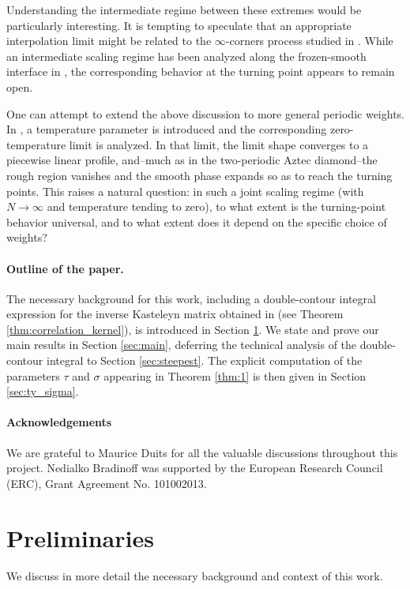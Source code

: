 \documentclass[11pt]{article}
\theoremstyle{plain}
\theoremstyle{definition}
\numberwithin{equation}{section}
\begin{document}
Understanding the intermediate regime between these extremes would be particularly interesting. It is tempting to speculate that an appropriate interpolation limit might be related to the $\infty$-corners process studied in \cite{GK24,GM20}. While an intermediate scaling regime has been analyzed along the frozen-smooth interface in \cite{JM23}, the corresponding behavior at the turning point appears to remain open.

One can attempt to extend the above discussion to more general periodic weights. In \cite{BB24}, a temperature parameter is introduced and the corresponding zero-temperature limit is analyzed. In that limit, the limit shape converges to a piecewise linear profile, and--much as in the two-periodic Aztec diamond--the rough region vanishes and the smooth phase expands so as to reach the turning points. This raises a natural question: in such a joint scaling regime (with $N\to\infty$ and temperature tending to zero), to what extent is the turning-point behavior universal, and to what extent does it depend on the specific choice of weights?



%

\paragraph{Outline of the paper.}
The necessary background for this work, including a double-contour integral expression for the inverse Kasteleyn matrix obtained in \cite{Ber21} (see Theorem \ref{thm:correlation_kernel}), is introduced in Section \ref{section:prelim}. We state and prove our main results in Section \ref{sec:main}, deferring the technical analysis of the double-contour integral to Section \ref{sec:steepest}. The explicit computation of the parameters $\tau$ and $\sigma$ appearing in Theorem \ref{thm:1} is then given in Section \ref{sec:ty_sigma}.
%


%

\paragraph{Acknowledgements}
We are grateful to Maurice Duits for all the valuable discussions throughout this project.
Nedialko Bradinoff was supported by the European Research Council (ERC), Grant Agreement No. 101002013.




\section{Preliminaries}\label{section:prelim}
We discuss in more detail the necessary background and context of this work. 
\end{document}

